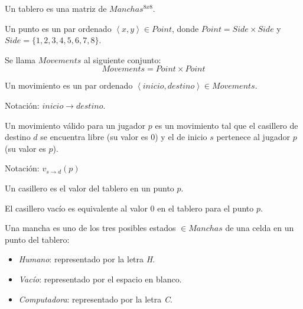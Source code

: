 \documentclass[10pt,a4paper,notitlepage,draft]{article}
\newenvironment{definition}[1][Definición]{\begin{trivlist}
\item[\hskip \labelsep {\bfseries #1}]}{\end{trivlist}}
\begin{document}
\begin{definition}Un tablero es una matriz de $Manchas^{8x8}$.\end{definition}

\begin{definition}
Un punto es un par ordenado $\left\langle x, y\right\rangle \in Point$, donde $Point = Side \times Side$ y $Side = \{1, 2, 3, 4, 5, 6, 7, 8\}$.
\end{definition}

\begin{definition}
Se llama $Movements$ al siguiente conjunto:
\begin{equation}
Movements = Point \times Point
\end{equation}
\end{definition}

\begin{definition}
Un movimiento es un par ordenado $\left\langle inicio, destino\right\rangle \in Movements$.

Notación: $inicio \rightarrow destino$.
\end{definition}

\begin{definition}
Un movimiento válido para un jugador $p$ es un movimiento tal que el casillero de destino $d$ se encuentra libre (su valor es $0$) y el de inicio $s$ pertenece al jugador $p$ (su valor es $p$).

Notación: $v_{s \rightarrow d}(p)$
\end{definition}

\begin{definition}
Un casillero es el valor del tablero en un punto $p$.
\end{definition}

\begin{definition}
El casillero vacío es equivalente al valor $0$ en el tablero para el punto $p$.
\end{definition}

\begin{definition}
Una mancha es uno de los tres posibles estados $\in Manchas$ de una celda en un punto del tablero:
\begin{itemize}
\item[-1] \emph{Humano}: representado por la letra \textit{H}.
\item[0] \emph{Vacío}: representado por el espacio en blanco.
\item[1] \emph{Computadora}: representado por la letra \textit{C}.
\end{itemize}
\end{definition}
\end{document}
